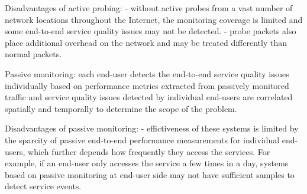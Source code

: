 Disadvantages of active probing:
- without active probes from a vast number of network locations throughout the
Internet, the monitoring coverage is limited and some end-to-end service
quality issues may not be detected.
- probe packets also place additional overhead on the network and may be
treated differently than normal packets.

Passive monitoring: each end-user detects the end-to-end service quality issues
individually based on performance metrics extracted from passively monitored
traffic and service quality issues detected by individual end-users are
correlated spatially and temporally to determine the scope of the problem.

Disadvantages of passive monitoring:
- effictiveness of these systems is limited by the sparcity of passive
end-to-end performance measurements for individual end-users, which further
depends how frequently they access the services. For example, if an end-user
only accesses the service a few times in a day, systems based on passive
monitoring at end-user side may not have sufficient samples to detect service
events.
